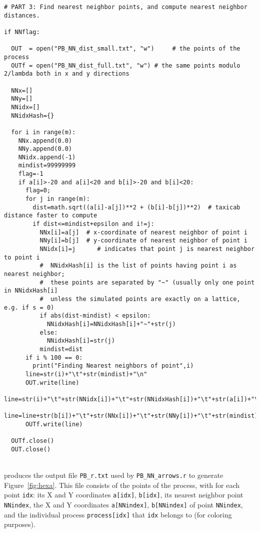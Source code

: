 \documentclass[10pt]{article}
\begin{document}
\begin{lstlisting}
# PART 3: Find nearest neighbor points, and compute nearest neighbor distances.

if NNflag:

  OUT  = open("PB_NN_dist_small.txt", "w")     # the points of the process
  OUTf = open("PB_NN_dist_full.txt", "w") # the same points modulo 2/lambda both in x and y directions

  NNx=[]
  NNy=[]
  NNidx=[]
  NNidxHash={}

  for i in range(m):
    NNx.append(0.0)
    NNy.append(0.0)
    NNidx.append(-1)
    mindist=99999999
    flag=-1
    if a[i]>-20 and a[i]<20 and b[i]>-20 and b[i]<20:
      flag=0;
      for j in range(m):
        dist=math.sqrt((a[i]-a[j])**2 + (b[i]-b[j])**2)  # taxicab distance faster to compute
        if dist<=mindist+epsilon and i!=j:
          NNx[i]=a[j]  # x-coordinate of nearest neighbor of point i
          NNy[i]=b[j]  # y-coordinate of nearest neighbor of point i
          NNidx[i]=j      # indicates that point j is nearest neighbor to point i
          #  NNidxHash[i] is the list of points having point i as nearest neighbor;
          #  these points are separated by "~" (usually only one point in NNidxHash[i]
          #  unless the simulated points are exactly on a lattice, e.g. if s = 0)
          if abs(dist-mindist) < epsilon:
            NNidxHash[i]=NNidxHash[i]+"~"+str(j)
          else:
            NNidxHash[i]=str(j)
          mindist=dist
      if i % 100 == 0:
        print("Finding Nearest neighbors of point",i)
      line=str(i)+"\t"+str(mindist)+"\n"
      OUT.write(line)
      line=str(i)+"\t"+str(NNidx[i])+"\t"+str(NNidxHash[i])+"\t"+str(a[i])+"\t"
      line=line+str(b[i])+"\t"+str(NNx[i])+"\t"+str(NNy[i])+"\t"+str(mindist)+"\n"
      OUTf.write(line)

  OUTf.close()
  OUT.close()
\end{lstlisting}
\quad \\
 produces the output file \texttt{PB\_r.txt} used by \texttt{PB\_NN\_arrows.r} to generate Figure~\ref{fig:hexa}.
This file consists of the points of the process, with for each point \texttt{idx}:
its X and Y coordinates \texttt{a[idx]}, \texttt{b[idx]}, its nearest neighbor point \texttt{NNindex}, the X and Y coordinates
\texttt{a[NNindex]}, \texttt{b[NNindex]} of point \texttt{NNindex}, and the individual process \texttt{process[idx]} that \texttt{idx} belongs to (for coloring purposes).
\end{document}
